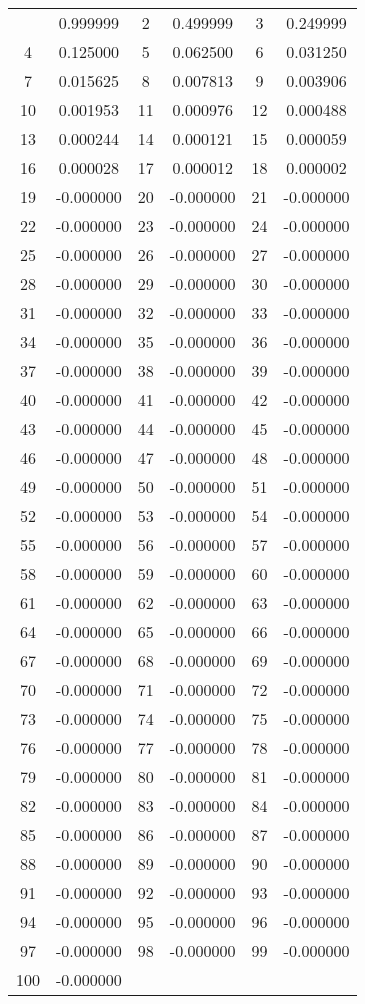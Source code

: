 \documentclass[12pt]{article}
\begin{document}
\begin{longtable}{@{}cc|cc|cc@{}}
\bottomrule
\endlastfoot
1 & 0.999999 & 2 & 0.499999 & 3 & 0.249999 \\
4 & 0.125000 & 5 & 0.062500 & 6 & 0.031250 \\
7 & 0.015625 & 8 & 0.007813 & 9 & 0.003906 \\
10 & 0.001953 & 11 & 0.000976 & 12 & 0.000488 \\
13 & 0.000244 & 14 & 0.000121 & 15 & 0.000059 \\
16 & 0.000028 & 17 & 0.000012 & 18 & 0.000002 \\
19 & -0.000000 & 20 & -0.000000 & 21 & -0.000000 \\
22 & -0.000000 & 23 & -0.000000 & 24 & -0.000000 \\
25 & -0.000000 & 26 & -0.000000 & 27 & -0.000000 \\
28 & -0.000000 & 29 & -0.000000 & 30 & -0.000000 \\
31 & -0.000000 & 32 & -0.000000 & 33 & -0.000000 \\
34 & -0.000000 & 35 & -0.000000 & 36 & -0.000000 \\
37 & -0.000000 & 38 & -0.000000 & 39 & -0.000000 \\
40 & -0.000000 & 41 & -0.000000 & 42 & -0.000000 \\
43 & -0.000000 & 44 & -0.000000 & 45 & -0.000000 \\
46 & -0.000000 & 47 & -0.000000 & 48 & -0.000000 \\
49 & -0.000000 & 50 & -0.000000 & 51 & -0.000000 \\
52 & -0.000000 & 53 & -0.000000 & 54 & -0.000000 \\
55 & -0.000000 & 56 & -0.000000 & 57 & -0.000000 \\
58 & -0.000000 & 59 & -0.000000 & 60 & -0.000000 \\
61 & -0.000000 & 62 & -0.000000 & 63 & -0.000000 \\
64 & -0.000000 & 65 & -0.000000 & 66 & -0.000000 \\
67 & -0.000000 & 68 & -0.000000 & 69 & -0.000000 \\
70 & -0.000000 & 71 & -0.000000 & 72 & -0.000000 \\
73 & -0.000000 & 74 & -0.000000 & 75 & -0.000000 \\
76 & -0.000000 & 77 & -0.000000 & 78 & -0.000000 \\
79 & -0.000000 & 80 & -0.000000 & 81 & -0.000000 \\
82 & -0.000000 & 83 & -0.000000 & 84 & -0.000000 \\
85 & -0.000000 & 86 & -0.000000 & 87 & -0.000000 \\
88 & -0.000000 & 89 & -0.000000 & 90 & -0.000000 \\
91 & -0.000000 & 92 & -0.000000 & 93 & -0.000000 \\
94 & -0.000000 & 95 & -0.000000 & 96 & -0.000000 \\
97 & -0.000000 & 98 & -0.000000 & 99 & -0.000000 \\
100 & -0.000000 &  &  &  &  \\

\end{longtable}
\end{document}

